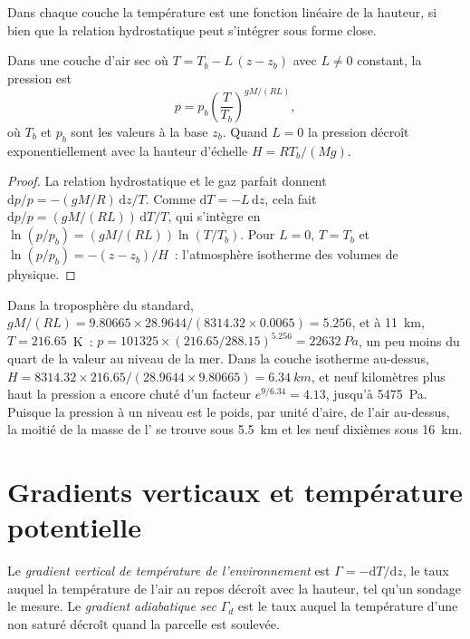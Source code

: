 Dans chaque couche la température est une fonction linéaire de la hauteur, si bien que la
relation hydrostatique peut s'intégrer sous forme close.

\begin{proposition}\label{prop:b1:fluid-envelopes-structure:layer-pressure}
Dans une couche d'air sec où $T = T_b - L\,(z - z_b)$ avec $L \neq 0$ constant, la
pression est
\[
  p = p_b \left(\frac{T}{T_b}\right)^{gM/(RL)},
\]
où $T_b$ et $p_b$ sont les valeurs à la base $z_b$. Quand $L = 0$ la
pression décroît exponentiellement avec la hauteur d'échelle $H = RT_b/(Mg)$.
\end{proposition}

\begin{proof}
La relation hydrostatique et le gaz parfait donnent $\mathrm dp/p = -(gM/R)\,\mathrm
dz/T$. Comme $\mathrm dT = -L\,\mathrm dz$, cela fait $\mathrm dp/p =
(gM/(RL))\,\mathrm dT/T$, qui s'intègre en $\ln(p/p_b) = (gM/(RL))
\ln(T/T_b)$. Pour $L = 0$, $T = T_b$ et $\ln(p/p_b) = -(z - z_b)/H$~:
l'atmosphère isotherme des volumes de physique.
\end{proof}

Dans la troposphère du standard, $gM/(RL) = 9.80665 \times 28.9644 /
(8314.32 \times 0.0065) = 5.256$, et à \qty{11}{km}, $T = 216.65$~K~:
$p = \num{101325} \times (216.65/288.15)^{5.256} = \qty{22632}{Pa}$, un peu
moins du quart de la valeur au niveau de la mer. Dans la couche isotherme au-dessus, $H =
8314.32 \times 216.65/(28.9644 \times 9.80665) = \qty{6.34}{km}$, et neuf
kilomètres plus haut la pression a encore chuté d'un facteur $e^{9/6.34} =
4.13$, jusqu'à \qty{5475}{Pa}. Puisque la pression à un niveau est le poids, par unité
d'aire, de l'air au-dessus, la moitié de la masse de l' se trouve sous
\qty{5.5}{km} et les neuf dixièmes sous \qty{16}{km}.

\section{Gradients verticaux et température potentielle}\label{sec:b1:fluid-envelopes-structure:lapse}

\begin{definition}\label{def:b1:fluid-envelopes-structure:lapse-rate}
Le \emph{gradient vertical de température de l'environnement} est $\Gamma =
-\mathrm dT/\mathrm dz$, le taux auquel la température de l'air au repos
décroît avec la hauteur, tel qu'un sondage le mesure. Le \emph{gradient adiabatique
sec} $\Gamma_d$ est le taux auquel la
température d'une  non saturé décroît quand la parcelle est soulevée.
\end{definition}

